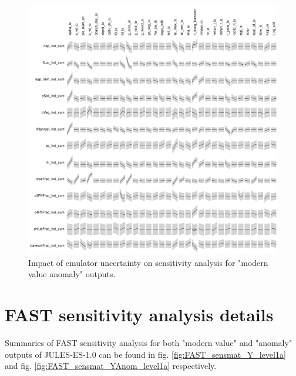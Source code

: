 \documentclass[gmd, manuscript]{copernicus}
\begin{document}
\begin{figure}[ht]
\includegraphics[width=12cm]{./figs/figA08.pdf}
\caption{Impact of emulator uncertainty on sensitivity analysis for "modern value anomaly" outputs.}
\label{fig:SA_uncertainty_anomaly}
\end{figure}

\section{FAST sensitivity analysis details}\label{app:sa_fast}

Summaries of FAST sensitivity analysis for both "modern value" and "anomaly" outputs of JULES-ES-1.0 can be found in fig. \ref{fig:FAST_sensmat_Y_level1a} and fig. \ref{fig:FAST_sensmat_YAnom_level1a} respectively.
\end{document}
